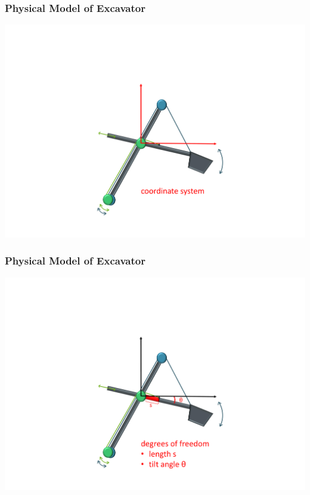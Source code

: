 \begin{frame}
	\frametitle{Physical Model of Excavator}
	
	
	
	\includegraphics[trim=22cm 5cm 2cm 23cm, clip=true, width=\linewidth]{img/Excavator_coordinates2}
	
\end{frame}

\begin{frame}
	\frametitle{Physical Model of Excavator}
	
	
	\includegraphics[trim=22cm 5cm 2cm 23cm, clip=true, width=\linewidth]{img/Excavator_dof2}
	
	
\end{frame}

